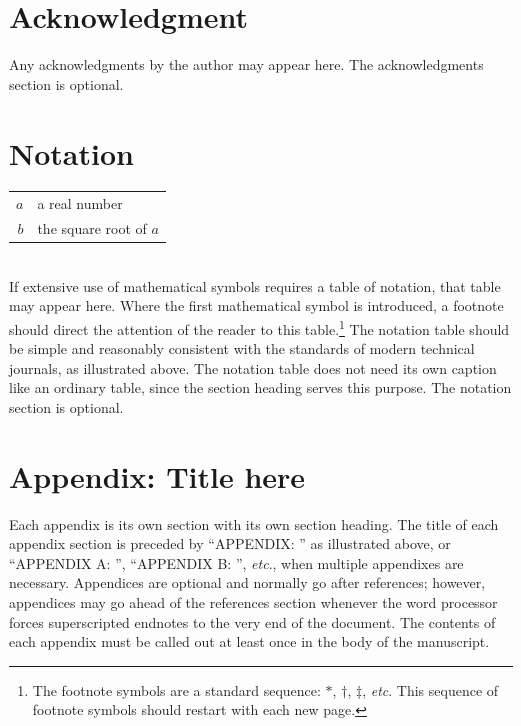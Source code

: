 \documentclass[letterpaper, preprint, paper,11pt]{AAS}	%
\begin{document}
\section{Acknowledgment}
Any acknowledgments by the author may appear here. The acknowledgments section is optional.


\section{Notation}
\begin{tabular}{r l}
	$a$ & a real number \\
	$b$ &  the square root of $a$ \\
\end{tabular} \\

If extensive use of mathematical symbols requires a table of notation, that table may appear here. Where the first mathematical symbol is introduced, a footnote should direct the attention of the reader to this table.\footnote{The footnote symbols are a standard sequence: $\ast$, $\dagger$, $\ddag$, \emph{etc}. This sequence of footnote symbols should restart with each new page.}  The notation table should be simple and reasonably consistent with the standards of modern technical journals, as illustrated above. The notation table does not need its own caption like an ordinary table, since the section heading serves this purpose. The notation section is optional.


\appendix
\section*{Appendix: Title here}
Each appendix is its own section with its own section heading. The title of each appendix section is preceded by ``APPENDIX: '' as illustrated above, or ``APPENDIX A: '', ``APPENDIX B: '', \emph{etc}., when multiple appendixes are necessary. Appendices are optional and normally go after references; however, appendices may go ahead of the references section whenever the word processor forces superscripted endnotes to the very end of the document. The contents of each appendix must be called out at least once in the body of the manuscript.


\end{document}
